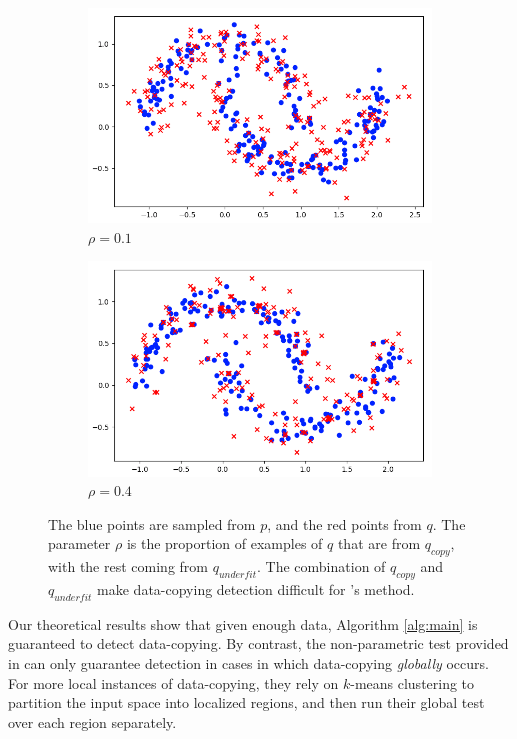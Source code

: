 \begin{figure}[ht]
	\begin{subfigure}{0.45\textwidth}\includegraphics[width=\linewidth]{rho1.png}\caption{$\rho = 0.1$}
	\end{subfigure}\hspace*{\fill}
	\begin{subfigure}{0.45\textwidth}
	\includegraphics[width=\linewidth]{rho4.png}\caption{$\rho = 0.4$}
	\end{subfigure}
	\caption{The blue points are sampled from $p$, and the red points from $q$. The parameter $\rho$ is the proportion of examples of $q$ that are from $q_{copy}$, with the rest coming from $q_{underfit}$. The combination of $q_{copy}$ and $q_{underfit}$ make data-copying detection difficult for \cite{MCD2020}'s method.}
	
	\label{fig:halfmoons}
\end{figure}

Our theoretical results show that given enough data, Algorithm \ref{alg:main} is guaranteed to detect data-copying. By contrast, the non-parametric test provided in \cite{MCD2020} can only guarantee detection in cases in which data-copying \textit{globally} occurs. For more local instances of data-copying, they rely on $k$-means clustering to partition the input space into localized regions, and then run their global test over each region separately.

